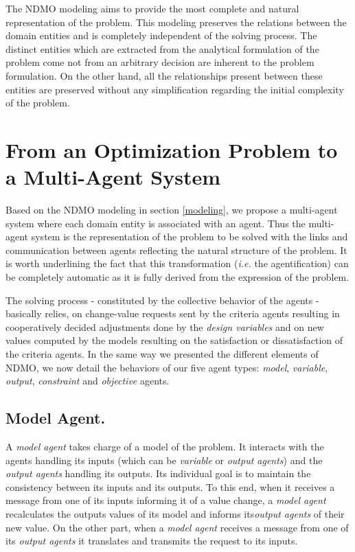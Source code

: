 The NDMO modeling aims to provide the most complete and natural representation of the problem. This modeling preserves the relations between the domain entities and is completely independent of the solving process. The distinct entities which are extracted from the analytical formulation of the problem come not from an arbitrary decision are inherent to the problem formulation. On the other hand, all the relationships present between these entities are preserved without any simplification regarding the initial complexity of the problem.

\section{From an Optimization Problem to a Multi-Agent System}

Based on the NDMO modeling in section \ref{modeling}, we propose a multi-agent system where each domain entity is associated with an agent. Thus the multi-agent system is the representation of the problem to be solved with the links and communication between agents reflecting the natural structure of the problem. It is worth underlining the fact that this transformation (\textit{i.e.} the agentification) can be completely automatic as it is fully derived from the expression of the problem.

The solving process - constituted by the collective behavior of the agents - basically relies, on change-value requests sent by the criteria agents resulting in cooperatively decided adjustments done by the \emph{design variables} and on new values computed by the models resulting on the satisfaction or dissatisfaction of the criteria agents. 
In the same way we presented the different elements of NDMO, we now detail the behaviors of our five agent types: \emph{model}, \emph{variable}, \emph{output}, \emph{constraint} and \emph{objective} agents.

\subsection{Model Agent.}

A \emph{model agent} takes charge of a model of the problem. It interacts with the agents handling its inputs (which can be \emph{variable} or \emph{output agents}) and the \emph{output agents} handling its outputs. Its individual goal is to maintain the consistency between its inputs and its outputs. To this end, when it receives a message from one of its inputs informing it of a value change, a \emph{model agent} recalculates the outputs values of its model and informs its\emph{output agents} of their new value. On the other part, when a \emph{model agent} receives a message from one of its \emph{output agents} it translates and transmits the request to its inputs. 


